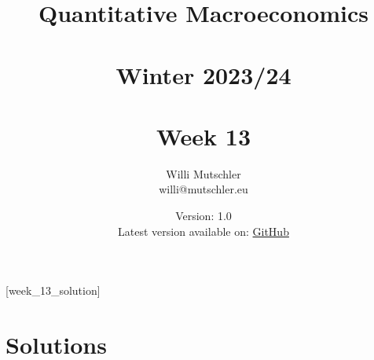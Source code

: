 
\newif\ifDisplaySolutions\DisplaySolutionstrue


\title{Quantitative Macroeconomics\\~\\Winter 2023/24\\~\\Week 13}
\author{Willi Mutschler\\willi@mutschler.eu}
\date{Version: 1.0\\Latest version available on: \href{https://github.com/wmutschl/Quantitative-Macroeconomics/releases/latest/download/week_13.pdf}{GitHub}}
\maketitle\thispagestyle{empty}

\newpage
{}[week_13_solution]
\tableofcontents\thispagestyle{empty}\newpage

\setcounter{page}{1}
\newpage
\newpage
\newpage
\printbibliography

\ifDisplaySolutions
\newpage
\appendix

\section{Solutions}

\fi
